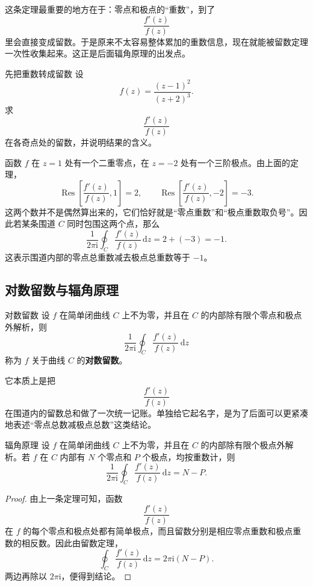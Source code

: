 \begin{tishi}[这条定理的意义]
这条定理最重要的地方在于：零点和极点的``重数''，到了
\[
    \frac{f'(z)}{f(z)}
\]
里会直接变成留数。于是原来不太容易整体累加的重数信息，现在就能被留数定理一次性收集起来。这正是后面辐角原理的出发点。
\end{tishi}

\begin{lizi}{先把重数转成留数}{}
设
\[
    f(z)=\frac{(z-1)^2}{(z+2)^3}.
\]
求
\[
    \frac{f'(z)}{f(z)}
\]
在各奇点处的留数，并说明结果的含义。

\begin{jie}
函数 $f$ 在 $z=1$ 处有一个二重零点，在 $z=-2$ 处有一个三阶极点。由上面的定理，
\[
    \operatorname{Res}\left[\frac{f'(z)}{f(z)},1\right]=2,\qquad
    \operatorname{Res}\left[\frac{f'(z)}{f(z)},-2\right]=-3.
\]
这两个数并不是偶然算出来的，它们恰好就是``零点重数''和``极点重数取负号''。因此若某条围道 $C$ 同时包围这两个点，那么
\[
    \frac{1}{2\pi \mathrm{i}}
    \oint_C \frac{f'(z)}{f(z)}\,\mathrm{d}z
    =
    2+(-3)
    =
    -1.
\]
这表示围道内部的零点总重数减去极点总重数等于 $-1$。
\end{jie}
\end{lizi}

\subsection{对数留数与辐角原理}

\begin{dingliyi}{对数留数}{}
设 $f$ 在简单闭曲线 $C$ 上不为零，并且在 $C$ 的内部除有限个零点和极点外解析，则
\[
    \frac{1}{2\pi \mathrm{i}}\oint_C \frac{f'(z)}{f(z)}\,\mathrm{d}z
\]
称为 $f$ 关于曲线 $C$ 的\textbf{对数留数}。
\end{dingliyi}

\begin{tishi}
它本质上是把
\[
    \frac{f'(z)}{f(z)}
\]
在围道内的留数总和做了一次统一记账。单独给它起名字，是为了后面可以更紧凑地表述``零点总数减极点总数''这类结论。
\end{tishi}

\begin{dingli}{辐角原理}{}
设 $f$ 在简单闭曲线 $C$ 上不为零，并且在 $C$ 的内部除有限个极点外解析。若 $f$ 在 $C$ 内部有 $N$ 个零点和 $P$ 个极点，均按重数计，则
\[
    \frac{1}{2\pi \mathrm{i}}
    \oint_C \frac{f'(z)}{f(z)}\,\mathrm{d}z
    =
    N-P.
\]
\end{dingli}

\begin{proof}
由上一条定理可知，函数
\[
    \frac{f'(z)}{f(z)}
\]
在 $f$ 的每个零点和极点处都有简单极点，而且留数分别是相应零点重数和极点重数的相反数。因此由留数定理，
\[
    \oint_C \frac{f'(z)}{f(z)}\,\mathrm{d}z
    =
    2\pi \mathrm{i}(N-P).
\]
两边再除以 $2\pi \mathrm{i}$，便得到结论。
\end{proof}

